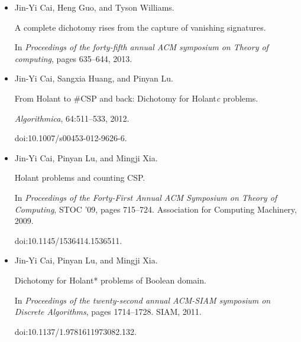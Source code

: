 \documentclass[10pt,a4paper]{article}
\begin{document}
\begin{itemize}
A complete dichotomy rises from the capture of vanishing signatures.


In \emph{Proceedings of the forty-fifth annual ACM symposium on Theory
of computing}, pages 635–644. Association for Computing Machinery, 2013.


doi:10.1145/2488608.2488687.





\item[] 
[12]

Jin-Yi Cai, Heng Guo, and Tyson Williams.


A complete dichotomy rises from the capture of vanishing signatures.


In \emph{Proceedings of the forty-fifth annual ACM symposium on Theory
of computing}, pages 635–644, 2013.





\item[] 
[13]

Jin-Yi Cai, Sangxia Huang, and Pinyan Lu.


From Holant to \#CSP and back: Dichotomy for Holant\emph{c}
problems.


\emph{Algorithmica}, 64:511–533, 2012.


doi:10.1007/s00453-012-9626-6.





\item[] 
[14]

Jin-Yi Cai, Pinyan Lu, and Mingji Xia.


Holant problems and counting CSP.


In \emph{Proceedings of the Forty-First Annual ACM Symposium on Theory
of Computing}, STOC ’09, pages 715–724. Association for Computing Machinery,
2009.


doi:10.1145/1536414.1536511.





\item[] 
[15]

Jin-Yi Cai, Pinyan Lu, and Mingji Xia.


Dichotomy for Holant* problems of Boolean domain.


In \emph{Proceedings of the twenty-second annual ACM-SIAM symposium on
Discrete Algorithms}, pages 1714–1728. SIAM, 2011.


doi:10.1137/1.9781611973082.132.






\end{itemize}
\end{document}
